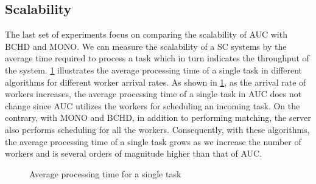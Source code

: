 \subsection{Scalability}
\label{subsec:exp_scale}
\vspace{-0.05in}
The last set of experiments focus on comparing the scalability of AUC with BCHD and MONO. We can measure the scalability of a SC systems by the average time required to process a task which in turn indicates the throughput of the system. \cref{fig:runtime} illustrates the average processing time of a single task in different algorithms for different worker arrival rates. As shown in \cref{fig:runtime}, as the arrival rate of workers increases, the average processing time of a single task in AUC does not change since AUC utilizes the workers for scheduling an incoming task. On the contrary, with MONO and BCHD, in addition to performing matching, the server also performs scheduling for all the workers. Consequently, with these algorithms, the average processing time of a single task grows as we increase the number of workers and is several orders of magnitude higher than that of AUC.

\begin{figure}[h]
    \centering
    \vspace{-0.15in}
    \caption{Average processing time for a single task}
    \label{fig:runtime}
\end{figure}

